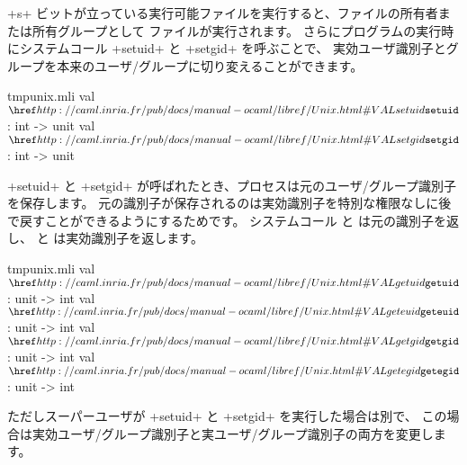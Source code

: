 \ml+s+ ビットが立っている実行可能ファイルを実行すると、ファイルの所有者または所有グループとして
ファイルが実行されます。
さらにプログラムの実行時にシステムコール \ml+setuid+ と \ml+setgid+ を呼ぶことで、
実効ユーザ識別子とグループを本来のユーザ/グループに切り変えることができます。
%
\begin{listingcodefile}{tmpunix.mli}
val $\libvalue{Unix}{setuid}$ : int -> unit
val $\libvalue{Unix}{setgid}$ : int -> unit
\end{listingcodefile}
%
\ml+setuid+ と \ml+setgid+ が呼ばれたとき、プロセスは元のユーザ/グループ識別子を保存します。
元の識別子が保存されるのは実効識別子を特別な権限なしに後で戻すことができるようにするためです。
システムコール  と  は元の識別子を返し、
 と  は実効識別子を返します。
%
\begin{listingcodefile}{tmpunix.mli}
val $\libvalue{Unix}{getuid}$ : unit -> int
val $\libvalue{Unix}{geteuid}$ : unit -> int
val $\libvalue{Unix}{getgid}$ : unit -> int
val $\libvalue{Unix}{getegid}$ : unit -> int
\end{listingcodefile}
ただしスーパーユーザが \ml+setuid+ と \ml+setgid+  を実行した場合は別で、
この場合は実効ユーザ/グループ識別子と実ユーザ/グループ識別子の両方を変更します。

